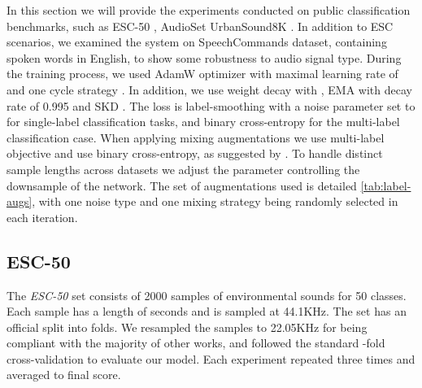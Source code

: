In this section we will provide the experiments conducted on public classification benchmarks, such as ESC-50 \cite{piczak2015esc}, AudioSet \cite{gemmeke2017audio}  UrbanSound8K \cite{salamon2014dataset}. In addition to ESC scenarios, we examined the system on SpeechCommands \cite{warden2018speech} dataset, containing spoken words in English, to show some robustness to audio signal type. During the training process, we used AdamW \cite{loshchilov2017decoupled} optimizer with maximal learning rate of  and one cycle strategy \cite{smith2018disciplined}. In addition, we use weight decay with , EMA \cite{tarvainen2017mean, izmailov2018averaging} with decay rate of 0.995 and SKD \cite{zhang2019your}. The loss is label-smoothing with a noise parameter set to  for single-label classification tasks, and binary cross-entropy for the multi-label classification case. When applying mixing augmentations we use multi-label objective and use binary cross-entropy, as suggested by \cite{wightman2021resnet}. To handle distinct sample lengths across datasets we adjust the parameter controlling the downsample of the network. The set of augmentations used is detailed \ref{tab:label-augs}, with one noise type and one mixing strategy being randomly selected in each iteration.

\subsection{ESC-50}
The \textit{ESC-50} set \cite{piczak2015esc} consists of 2000 samples of environmental sounds for 50 classes. Each sample has a length of  seconds and is sampled at 44.1KHz. The set has an official split into  folds. We resampled the samples to 22.05KHz for being compliant with the majority of other works, and followed the standard -fold cross-validation to evaluate our model. Each experiment repeated three times and averaged to final score.

